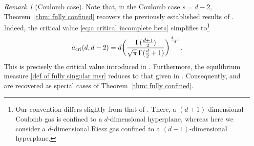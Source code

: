 \documentclass{amsart}
\theoremstyle{plain}
\theoremstyle{remark}
\newtheorem{rem}{Remark}%
\numberwithin{equation}{section}
\begin{document}
\begin{rem}[Coulomb case]
Note that, in the Coulomb case $s=d-2$, Theorem~\ref{thm: fully confined} recovers the previously established results of
\cite{DKMSS17,ASZ14,BFMS26,FIT26}.
Indeed, the critical value \eqref{eq:a critical incomplete beta} simplifies to\footnote{Our convention differs slightly from that of
\cite{BFMS26}. There, a $(d+1)$-dimensional Coulomb gas is confined to a
$d$-dimensional hyperplane, whereas here we consider a
$d$-dimensional Riesz gas confined to a $(d-1)$-dimensional
hyperplane.}
\begin{equation} \label{def of critical value Coulomb}
 a_{\rm cri}(d,d-2)
 = d \bigg( \frac{ \Gamma(\frac{d+1}{2})  }{ \sqrt{\pi} \, \Gamma(\frac{d}{2}+1)   } \bigg)^{ \frac{d-1}{d} }.
\end{equation}
This is precisely the critical value introduced in \cite{BFMS26}.
Furthermore, the equilibrium measure \eqref{def of fully singular msr} reduces to that given in \cite[Eq.~(2.54)]{BFMS26}. Consequently,
\cite[Theorem~2.7]{BFMS26} and \cite[Theorem~1.2 (c)]{FIT26} are recovered as special cases of Theorem~\ref{thm: fully confined}.
\end{rem}
\end{document}
